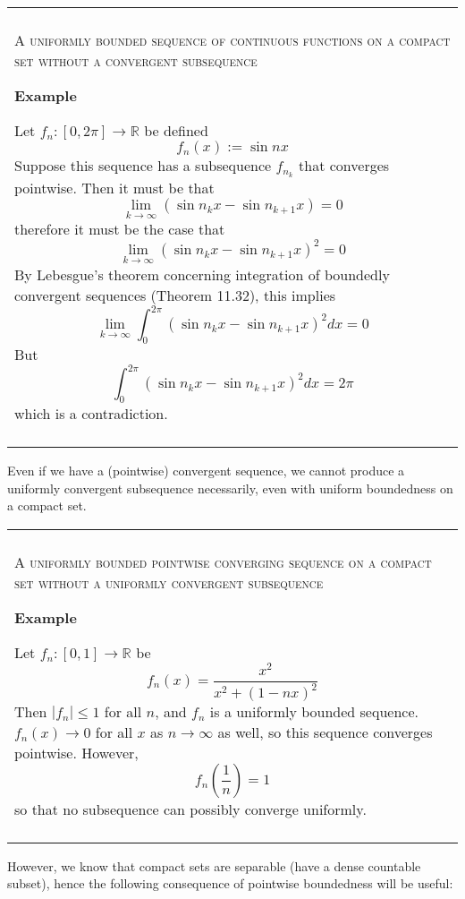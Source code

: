 \documentclass{article}
\newenvironment{myboxed}{\bigskip\noindent\begin{tabular}{|p{.975\linewidth}|}\hline \\}{\\\\\hline\end{tabular}\bigskip}
\begin{document}
\begin{myboxed}
    \textsc{A uniformly bounded sequence of continuous functions on a compact set without a convergent subsequence}
    
    \textbf{Example}

    Let $f_n: [0, 2\pi] \to \mathbb{R}$ be defined 
    \[f_n(x) := \sin nx\]
    Suppose this sequence has a subsequence $f_{n_k}$ that converges pointwise. Then it must be that
    \[\lim_{k \to \infty} (\sin n_k x - \sin n_{k+1}x) = 0\]
    therefore it must be the case that
    \[\lim_{k \to \infty} (\sin n_k x - \sin n_{k+1}x)^2 = 0\]
    By Lebesgue's theorem concerning integration of boundedly convergent sequences (Theorem 11.32), this implies
    \[\lim_{k \to \infty} \int_0^{2\pi} (\sin n_k x - \sin n_{k+1} x)^2 dx = 0\]
    But 
    \[\int_0^{2\pi} (\sin n_k x - \sin n_{k+1} x)^2 dx = 2\pi\]
    which is a contradiction.
\end{myboxed}

Even if we have a (pointwise) convergent sequence, we cannot produce a uniformly convergent subsequence necessarily, even with uniform boundedness on a compact set.

\begin{myboxed}
    \textsc{A uniformly bounded pointwise converging sequence on a compact set without a uniformly convergent subsequence}

    \textbf{Example}

    Let $f_n: [0, 1] \rightarrow \mathbb{R}$ be
    \[f_n(x) = \frac{x^2}{x^2+(1-nx)^2}\]
    Then $|f_n| \leq 1$ for all $n$, and $f_n$ is a uniformly bounded sequence. $f_n(x) \to 0$ for all $x$ as $n \to \infty$ as well, so this sequence converges pointwise.
    However,
    \[f_n\left(\frac{1}{n}\right) = 1\]
    so that no subsequence can possibly converge uniformly.
\end{myboxed}

However, we know that compact sets are separable (have a dense countable subset), hence the following consequence of pointwise boundedness will be useful:
\end{document}
